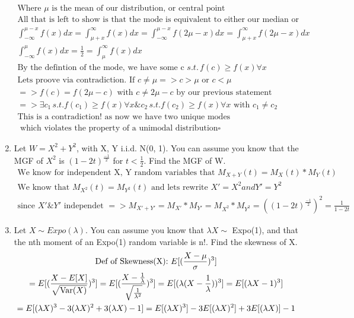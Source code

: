 \documentclass[11pt]{article}
\newcommand{\Var}{\mathop{\rm Var}}
\begin{document}
\begin{enumerate}
\begin{gather}
	\text{Where $\mu$ is the mean of our distribution, or central point}\\
	\text{All that is left to show is that the mode is equivalent to either our median or mean}\\
	\int_{-\infty}^{\mu - x} f(x)dx = \int_{\mu + x}^{\infty} f(x)dx = \int_{-\infty}^{\mu - x} f(2\mu - x)dx = \int_{\mu + x}^{\infty} f(2\mu - x)dx\\
	\int_{-\infty}^{\mu} f(x)dx = \frac{1}{2}= \int_{\mu}^{\infty} f(x)dx\\
	\text{By the defintion of the mode, we have some c } s.t. \, f(c) \ge f(x) \forall x\\
	\text{Lets proove via contradiction. If } c \ne \mu => c > \mu \text{ or } c<\mu\\
	=> f(c) = f(2\mu - c) \text{ with } c \ne 2\mu-c \text{ by our previous statement}\\
	=> \exists c_1 \, s.t. f(c_1)\ge f(x) \forall x \& c_2 \, s.t. f(c_2)\ge f(x) \forall x \text{ with } c_1 \ne c_2\\
	\text{This is a contradiction! as now we have two unique modes}\\
	\text{ which violates the property of a unimodal distribution} \square
\end{gather}
\item Let $W = X^2 + Y^2$, with X, Y i.i.d. N(0, 1). You can assume you know that the MGF of $X^2$ is $(1 - 2t)^{\frac{-1}{2}}$ for $t < \frac{1}{2}.$ 
Find the MGF of W.
\begin{gather}
	\text{We know for independent X, Y random variables that } M_{X+Y}(t)=M_X(t)*M_Y(t) \\
	\text{We know that }M_{X^2}(t)=M_{Y^2}(t) \text{ and lets rewrite }X'=X^2 and Y' = Y^2\\
	\text{since } X' \& Y' \text{ independet } => M_{X'+Y'}=M_{X'}*M_{Y'}=M_{X^2}*M_{Y^2}=((1 - 2t)^{\frac{-1}{2}})^2 =\frac{1}{1-2t}
\end{gather}
\item Let $X \sim Expo(\lambda)$. You can assume you know that $\lambda X \sim$ Expo(1), and that the nth moment of an Expo(1) random variable is n!. Find the skewness of X.
\begin{gather}
	\text{Def of Skewness(X): } E[(\frac{X-\mu}{\sigma})^3]\\
	= E[(\frac{X-E[X]}{\sqrt{\Var(X)}})^3]=E[(\frac{X-\frac{1}{\lambda}}{\sqrt{\frac{1}{\lambda^2}}})^3] = E[(\lambda(X-\frac{1}{\lambda}))^3]= E[(\lambda X-1)^3] \\
	= E[(\lambda X)^3-3(\lambda X)^2 + 3(\lambda X) - 1] = E[(\lambda X)^3] - 3E[(\lambda X)^2] + 3E[(\lambda X)] - 1\\

\end{gather}
\end{enumerate}
\end{document}
